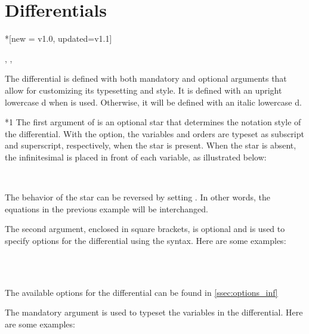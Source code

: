 	
	\clearpage
	\section{Differentials}\label{sec:differential}

\begin{function}*{\odif}[new = v1.0, updated=v1.1]
	\begin{syntax}
		\sarg, , 
	\end{syntax}
	The differential  is defined with both mandatory and optional arguments that allow for customizing its typesetting and style. It is defined with an upright lowercase d when  is used. Otherwise, it will be defined with an italic lowercase d.
	\begin{definition}
	\end{definition}
	
	\begin{argument}*{1}
		The first argument of  is an optional star that determines the notation style of the differential. With the  option, the variables and orders are typeset as subscript and superscript, respectively, when the star is present. When the star is absent, the infinitesimal is placed in front of each variable, as illustrated below:
		\begin{example}
			 \\
		\end{example}
		The behavior of the star can be reversed by setting . In other words, the equations in the previous example will be interchanged.
	\end{argument}
	
	\begin{argument}{2}
		The second argument, enclosed in square brackets, is optional and is used to specify options for the differential using the  syntax. Here are some examples:
		\begin{example}
			\odif[order={n,3}]{x,y,z} \\
			\odif[sep-var-inf=0]{x,y,z} \\
			\odif*[sep-var-var=0]{x,y,z}
		\end{example}
		The available options for the differential can be found in \cref{ssec:options_inf}
	\end{argument}
	
	\begin{argument}{3}
		The mandatory argument is used to typeset the variables in the differential. Here are some examples:
		\begin{example}
			\odif{x} \\
			\odif{s_1,s_2...,s_n}
		\end{example}
	\end{argument}
\end{function}

